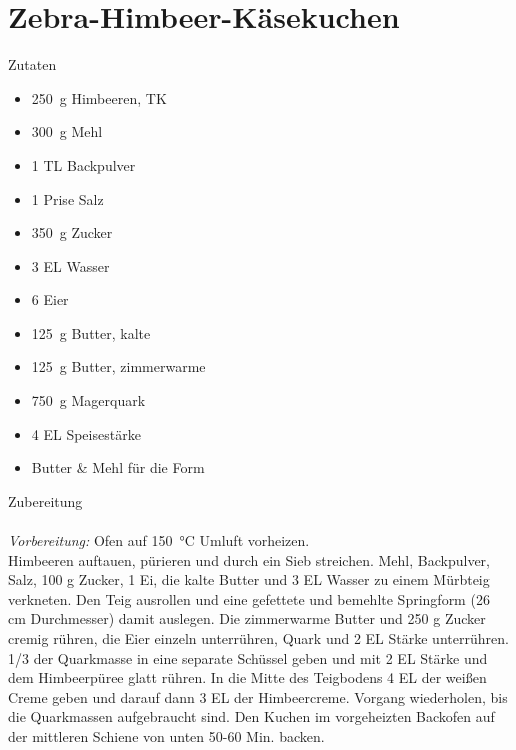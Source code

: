 \section*{Zebra-Himbeer-Käsekuchen}
\ihead{}\ohead{}
\cfoot{}
{\Large Zutaten}
\begin{multicols}{2}
\begin{itemize}
    \item \SI{250}{g} Himbeeren, TK
    \item \SI{300}{g} Mehl
    \item \num{1} TL Backpulver
    \item \num{1} Prise Salz
    \item \SI{350}{g} Zucker
    \item \num{3} EL Wasser
    \item \num{6} Eier
    \item \SI{125}{g} Butter, kalte
    \item \SI{125}{g} Butter, zimmerwarme
    \item \SI{750}{g} Magerquark
    \item \num{4} EL Speisestärke
    \item Butter & Mehl für die Form
\end{itemize}
\end{multicols}
\noindent
{\Large Zubereitung}\\
\\
\textit{Vorbereitung:} Ofen auf \SI{150}{\celsius} Umluft vorheizen.\\
Himbeeren auftauen, pürieren und durch ein Sieb streichen.
Mehl, Backpulver, Salz, 100 g Zucker, 1 Ei, die kalte Butter und 3 EL Wasser zu einem Mürbteig verkneten.
Den Teig ausrollen und eine gefettete und bemehlte Springform (26 cm Durchmesser) damit auslegen.
Die zimmerwarme Butter und 250 g Zucker cremig rühren, die Eier einzeln unterrühren, Quark und 2 EL Stärke unterrühren.
1/3 der Quarkmasse in eine separate Schüssel geben und mit 2 EL Stärke und dem Himbeerpüree glatt rühren.
In die Mitte des Teigbodens 4 EL der weißen Creme geben und darauf dann 3 EL der Himbeercreme.
Vorgang wiederholen, bis die Quarkmassen aufgebraucht sind.
Den Kuchen im vorgeheizten Backofen auf der mittleren Schiene von unten 50-60 Min. backen.
